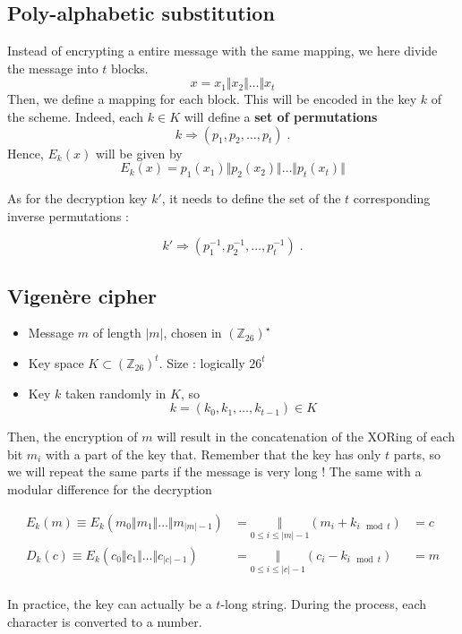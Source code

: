 \documentclass[a4paper, 12pt]{book}
\begin{document}
\subsection{Poly-alphabetic substitution}
Instead of encrypting a entire message with the same mapping, we here divide the message into $t$ blocks.
$$ x = x_1 \Vert x_2 \Vert \dots \Vert x_t$$
Then, we define a mapping for each block. This will be encoded in the key $k$ of the scheme. Indeed, each $k\in K$ will define a \textbf{set of permutations} 
$$k \Rightarrow (p_1, p_2, \dots, p_t) \; .$$
Hence, $E_k(x)$ will be given by 
$$E_k(x) = p_1(x_1) \Vert p_2(x_2) \Vert \dots \Vert p_t(x_t) \Vert $$

As for the decryption key $k'$, it needs to define the set of the $t$ corresponding inverse permutations :

$$k' \Rightarrow (p_1^{-1}, p_2^{-1}, \dots, p_t^{-1}) \; .$$

\subsection{Vigenère cipher} 
\begin{itemize}
    \item Message $m$ of length $|m|$, chosen in $(\mathbb{Z}_{26})^\star$
    \item Key space $K \subset (\mathbb{Z}_{26})^t$. Size : logically $26^t$
    \item Key $k$ taken randomly in $K$, so 
    $$k = (k_0, k_1, \dots, k_{t-1}) \in K$$
\end{itemize}
Then, the encryption of $m$ will result in the concatenation of the XORing of each bit $m_i$ with a part of the key that. Remember that the key has only $t$ parts, so we will repeat the same parts if the message is very long ! The same with a modular difference for the decryption

$$\begin{array}{rll}
    E_k(m) \equiv E_k(m_0 \Vert m_1 \Vert \dots \Vert m_{|m|-1}) &=  \underset{\scriptscriptstyle{0\leq i \leq |m|-1}}{\Vert} (m_i + k_{i  \mod{t}}) &= c \\
    D_k(c) \equiv E_k(c_0 \Vert c_1 \Vert \dots \Vert c_{|c|-1}) &=  \underset{\scriptscriptstyle{0\leq i \leq |c|-1}}{\Vert} (c_i - k_{i  \mod{t}}) &= m \\
\end{array}$$

In practice, the key can actually be a $t$-long string. During the process, each character is converted to a number.
\end{document}
